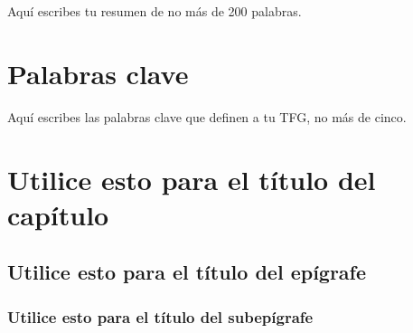 \documentclass[13pt,a4paper]{report}
\begin{document}
Aquí escribes tu resumen de no más de 200 palabras.


\section{Palabras clave}


Aquí escribes las palabras clave que definen a tu TFG, no más de cinco.

\newpage  


\section{Utilice esto para el título del capítulo} 

\subsection*{Utilice esto para el título del epígrafe} 


\subsubsection*{Utilice esto para el título del subepígrafe} 
\end{document}
